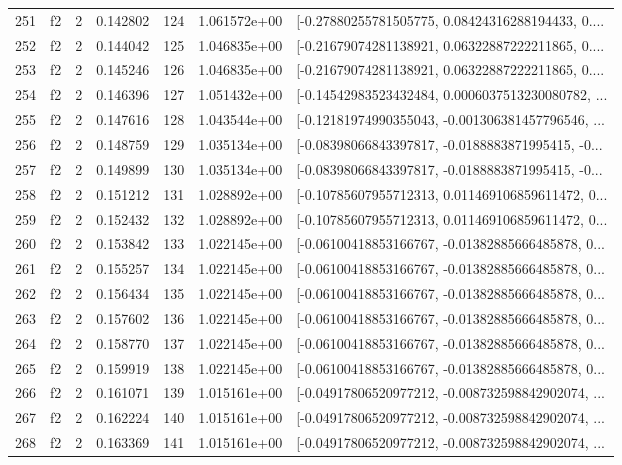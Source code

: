 \begin{tabular}{lllrlrl}
251 &  f2 &   2 &  0.142802 &  124 &  1.061572e+00 &  [-0.27880255781505775, 0.08424316288194433, 0.... \\
252 &  f2 &   2 &  0.144042 &  125 &  1.046835e+00 &  [-0.21679074281138921, 0.06322887222211865, 0.... \\
253 &  f2 &   2 &  0.145246 &  126 &  1.046835e+00 &  [-0.21679074281138921, 0.06322887222211865, 0.... \\
254 &  f2 &   2 &  0.146396 &  127 &  1.051432e+00 &  [-0.14542983523432484, 0.0006037513230080782, ... \\
255 &  f2 &   2 &  0.147616 &  128 &  1.043544e+00 &  [-0.12181974990355043, -0.001306381457796546, ... \\
256 &  f2 &   2 &  0.148759 &  129 &  1.035134e+00 &  [-0.08398066843397817, -0.0188883871995415, -0... \\
257 &  f2 &   2 &  0.149899 &  130 &  1.035134e+00 &  [-0.08398066843397817, -0.0188883871995415, -0... \\
258 &  f2 &   2 &  0.151212 &  131 &  1.028892e+00 &  [-0.10785607955712313, 0.011469106859611472, 0... \\
259 &  f2 &   2 &  0.152432 &  132 &  1.028892e+00 &  [-0.10785607955712313, 0.011469106859611472, 0... \\
260 &  f2 &   2 &  0.153842 &  133 &  1.022145e+00 &  [-0.06100418853166767, -0.01382885666485878, 0... \\
261 &  f2 &   2 &  0.155257 &  134 &  1.022145e+00 &  [-0.06100418853166767, -0.01382885666485878, 0... \\
262 &  f2 &   2 &  0.156434 &  135 &  1.022145e+00 &  [-0.06100418853166767, -0.01382885666485878, 0... \\
263 &  f2 &   2 &  0.157602 &  136 &  1.022145e+00 &  [-0.06100418853166767, -0.01382885666485878, 0... \\
264 &  f2 &   2 &  0.158770 &  137 &  1.022145e+00 &  [-0.06100418853166767, -0.01382885666485878, 0... \\
265 &  f2 &   2 &  0.159919 &  138 &  1.022145e+00 &  [-0.06100418853166767, -0.01382885666485878, 0... \\
266 &  f2 &   2 &  0.161071 &  139 &  1.015161e+00 &  [-0.04917806520977212, -0.008732598842902074, ... \\
267 &  f2 &   2 &  0.162224 &  140 &  1.015161e+00 &  [-0.04917806520977212, -0.008732598842902074, ... \\
268 &  f2 &   2 &  0.163369 &  141 &  1.015161e+00 &  [-0.04917806520977212, -0.008732598842902074, ... \\

\end{tabular}
